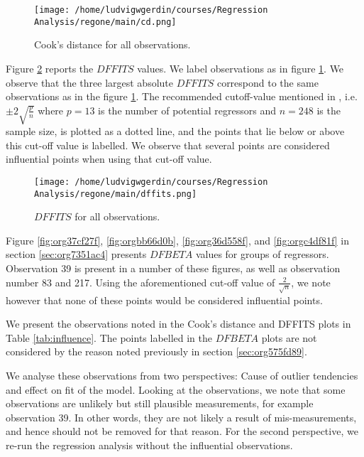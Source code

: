 \documentclass[11pt]{article}
\begin{document}
\begin{figure}[h]
\centering
\texttt{[image: /home/ludvigwgerdin/courses/Regression Analysis/regone/main/cd.png]}
\caption{\label{fig:org832655c}
Cook's distance for all observations.}
\end{figure}

Figure \ref{fig:org073856e} reports the \(DFFITS\) values. We label observations as in figure \ref{fig:org832655c}. We observe 
that the three largest absolute \(DFFITS\) correspond to the same observations as in the figure \ref{fig:org832655c}. 
The recommended cutoff-value mentioned in \cite{Montgomery2012}, i.e. \(\pm 2\sqrt{\frac{p}{n}}\)
where \(p = 13\) is the number of potential regressors and \(n = 248\) is the sample size, is 
plotted as a dotted line, and the points that lie below or above this cut-off value is labelled.
We observe that several points are considered influential points when using that cut-off value.

\begin{figure}[h]
\centering
\texttt{[image: /home/ludvigwgerdin/courses/Regression Analysis/regone/main/dffits.png]}
\caption{\label{fig:org073856e}
\(DFFITS\) for all observations.}
\end{figure}

Figure \ref{fig:org37cf27f}, \ref{fig:orgbb66d0b}, \ref{fig:org36d558f}, and
\ref{fig:orgc4df81f} in section \ref{sec:org7351ac4} presents \(DFBETA\) values for groups of regressors. 
Observation 39 is present in a number of these figures, as well as observation number 83 and 217. 
Using the aforementioned cut-off value of \(\frac{2}{\sqrt{n}}\), we note however that none of these points
would be considered influential points.

We present the observations noted in the Cook's distance and DFFITS plots in Table \ref{tab:influence}.
The points labelled in the \(DFBETA\) plots are not considered by the reason noted previously 
in section \ref{sec:org575fd89}. 

We analyse these observations from two perspectives: Cause of outlier tendencies and effect on fit of 
the model. Looking at the observations, we note that some observations are unlikely but 
still plausible measurements, for example observation 39. In other words, they are not likely a result
of mis-measurements, and hence should not be removed for that reason. For the second perspective, 
we re-run the regression analysis without the influential observations. 


\end{document}
